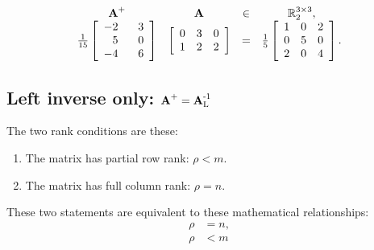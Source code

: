 \begin{equation*}
  \begin{array}{cccc}
    \Ap&\A{}&\in&\real{\by{3}{3}}_{2},\\
   \frac{1}{15}\mat{rr}{-2&\phantom{-}3\\5&0\\-4&6} &
   \mat{ccc}
  {
  0 & 3 & 0 \\
  1 & 2 & 2
  } &=&
   \frac{1}{5}
   \mat{ccc}
   {
   1&0&2\\
   0&5&0\\
   2&0&4
   }.
  \end{array}
\end{equation*}

\subsection{Left inverse only: $\Ap = \AinvL$}
The two rank conditions are these:
\begin{enumerate}
\item The matrix has partial row rank: $\rho < m$.
\item The matrix has full column rank: $\rho = n$.
\end{enumerate}
These two statements are equivalent to these mathematical relationships:
\begin{equation}
  \begin{split}
     \rho &= n, \\
     \rho &< m
  \end{split}
\end{equation}

